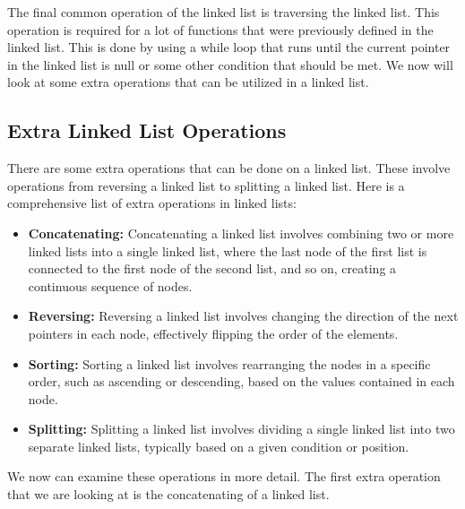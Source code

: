 The final common operation of the linked list is traversing the linked list. This operation is required for a lot of functions that were previously defined in the linked list. This is done by using a
while loop that runs until the current pointer in the linked list is null or some other condition that should be met. We now will look at some extra operations that can be utilized in a linked list.

\subsection*{Extra Linked List Operations}

There are some extra operations that can be done on a linked list. These involve operations from reversing a linked list to splitting a linked list. Here is a comprehensive list of extra operations
in linked lists:

\begin{itemize}
    \item \textbf{Concatenating:} Concatenating a linked list involves combining two or more linked lists into a single linked list, where the last node of the first list is connected to the first node 
    of the second list, and so on, creating a continuous sequence of nodes.
    \item \textbf{Reversing:} Reversing a linked list involves changing the direction of the next pointers in each node, effectively flipping the order of the elements.
    \item \textbf{Sorting:} Sorting a linked list involves rearranging the nodes in a specific order, such as ascending or descending, based on the values contained in each node.
    \item \textbf{Splitting:} Splitting a linked list involves dividing a single linked list into two separate linked lists, typically based on a given condition or position.
\end{itemize}

We now can examine these operations in more detail. The first extra operation that we are looking at is the concatenating of a linked list.

